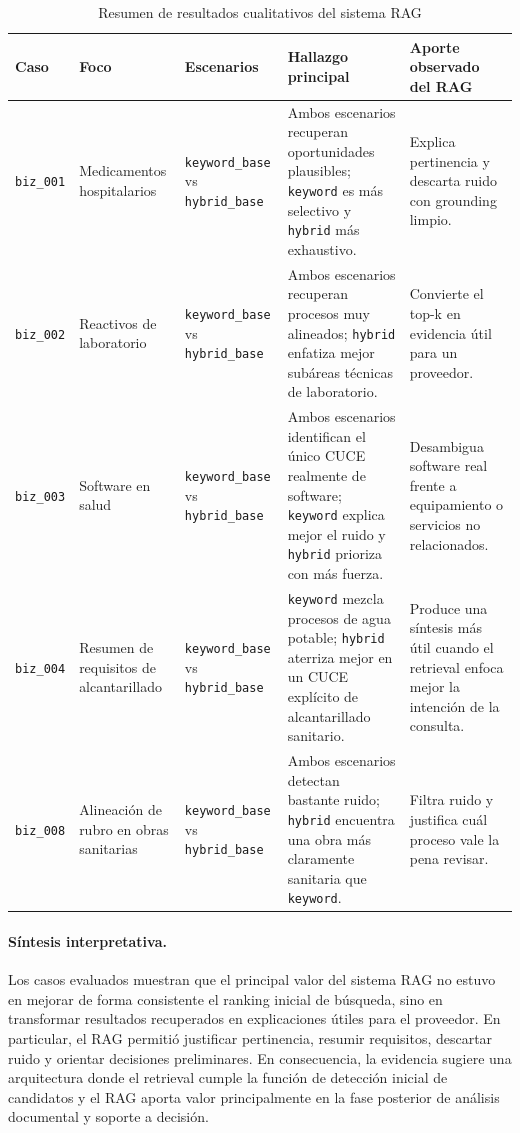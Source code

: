 \begin{table}[ht]
\centering
\caption{Resumen de resultados cualitativos del sistema RAG}
\label{tab:resumen-rag-cualitativo}
\begin{tabular}{p{1.6cm} p{2.7cm} p{2.8cm} p{3.7cm} p{3.7cm}}
\hline
\textbf{Caso} & \textbf{Foco} & \textbf{Escenarios} & \textbf{Hallazgo principal} & \textbf{Aporte observado del RAG} \\
\hline
\texttt{biz\_001} & Medicamentos hospitalarios & \texttt{keyword\_base} vs \texttt{hybrid\_base} & Ambos escenarios recuperan oportunidades plausibles; \texttt{keyword} es más selectivo y \texttt{hybrid} más exhaustivo. & Explica pertinencia y descarta ruido con grounding limpio. \\
\hline
\texttt{biz\_002} & Reactivos de laboratorio & \texttt{keyword\_base} vs \texttt{hybrid\_base} & Ambos escenarios recuperan procesos muy alineados; \texttt{hybrid} enfatiza mejor subáreas técnicas de laboratorio. & Convierte el top-k en evidencia útil para un proveedor. \\
\hline
\texttt{biz\_003} & Software en salud & \texttt{keyword\_base} vs \texttt{hybrid\_base} & Ambos escenarios identifican el único CUCE realmente de software; \texttt{keyword} explica mejor el ruido y \texttt{hybrid} prioriza con más fuerza. & Desambigua software real frente a equipamiento o servicios no relacionados. \\
\hline
\texttt{biz\_004} & Resumen de requisitos de alcantarillado & \texttt{keyword\_base} vs \texttt{hybrid\_base} & \texttt{keyword} mezcla procesos de agua potable; \texttt{hybrid} aterriza mejor en un CUCE explícito de alcantarillado sanitario. & Produce una síntesis más útil cuando el retrieval enfoca mejor la intención de la consulta. \\
\hline
\texttt{biz\_008} & Alineación de rubro en obras sanitarias & \texttt{keyword\_base} vs \texttt{hybrid\_base} & Ambos escenarios detectan bastante ruido; \texttt{hybrid} encuentra una obra más claramente sanitaria que \texttt{keyword}. & Filtra ruido y justifica cuál proceso vale la pena revisar. \\
\hline
\end{tabular}
\end{table}

\paragraph{Síntesis interpretativa.}
Los casos evaluados muestran que el principal valor del sistema RAG no estuvo en mejorar de forma consistente el ranking inicial de búsqueda, sino en transformar resultados recuperados en explicaciones útiles para el proveedor. En particular, el RAG permitió justificar pertinencia, resumir requisitos, descartar ruido y orientar decisiones preliminares. En consecuencia, la evidencia sugiere una arquitectura donde el retrieval cumple la función de detección inicial de candidatos y el RAG aporta valor principalmente en la fase posterior de análisis documental y soporte a decisión.
